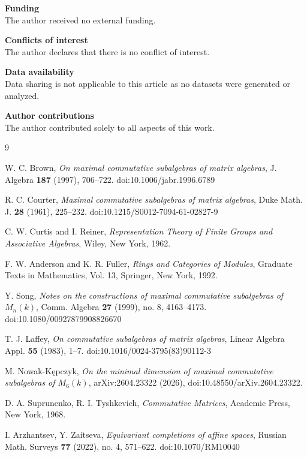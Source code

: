 \documentclass[11pt]{article}
\theoremstyle{remark}
\theoremstyle{plain}
\theoremstyle{definition}
\theoremstyle{myremark}
\begin{document}
\textbf{Funding} \\
The author received no external funding.

\textbf{Conflicts of interest} \\
The author declares that there is no conflict of interest.

\textbf{Data availability} \\
Data sharing is not applicable to this article as no datasets were generated or analyzed.

\textbf{Author contributions} \\
The author contributed solely to all aspects of this work.


\begin{thebibliography}{9}
	
	
	
	W. C. Brown,
	\emph{On maximal commutative subalgebras of matrix algebras},
	J. Algebra \textbf{187} (1997), 706--722.
	doi:10.1006/jabr.1996.6789
	
	R. C. Courter,
	\emph{Maximal commutative subalgebras of matrix algebras},
	Duke Math. J. \textbf{28} (1961), 225--232.
	doi:10.1215/S0012-7094-61-02827-9
	
	C. W. Curtis and I. Reiner,
	\emph{Representation Theory of Finite Groups and Associative Algebras},
	Wiley, New York, 1962.
	
F. W. Anderson and K. R. Fuller,
\emph{Rings and Categories of Modules},
Graduate Texts in Mathematics, Vol. 13,
Springer, New York, 1992.
	
	Y. Song,
	\emph{Notes on the constructions of maximal commutative subalgebras of $M_n(k)$},
	Comm. Algebra \textbf{27} (1999), no. 8, 4163--4173.
	doi:10.1080/00927879908826670
	
	T. J. Laffey,
	\emph{On commutative subalgebras of matrix algebras},
	Linear Algebra Appl. \textbf{55} (1983), 1--7.
	doi:10.1016/0024-3795(83)90112-3
	
	M. Nowak-K\k{e}pczyk,
	\emph{On the minimal dimension of maximal commutative subalgebras of {$M_6(k)$}},
	arXiv:2604.23322 (2026), doi:10.48550/arXiv.2604.23322.
	
	D. A. Suprunenko, R. I. Tyshkevich,
	\emph{Commutative Matrices},
	Academic Press, New York, 1968.
	
	I. Arzhantsev, Y. Zaitseva, 
	\emph{Equivariant completions of affine spaces}, Russian Math. Surveys \textbf{77} (2022), no. 4, 571--622. doi:10.1070/RM10040
	

	

	
\end{thebibliography}
\end{document}

